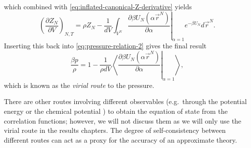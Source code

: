 which combined with \eqref{eq:inflated-canonical-Z-derivative} yields
\begin{equation*}
  \left( \frac{\partial Z_N}{\partial V} \right)_{N,T}
  =
  \rho Z_N
  -
  \frac{1}{d V}
  \int_{V^N}
  \left. \frac{\partial \beta U_N(\alpha \vec{r}^N)}{\partial \alpha} \right|_{\alpha = 1}
  e^{-\beta U_N}
  d\vec{r}^N.
\end{equation*}
Inserting this back into \eqref{eq:pressure-relation-2} gives the final result
\begin{equation}\label{eq:virial-route-pressure}
  \frac{\beta p}{\rho}
  =
  1
  -
  \frac{1}{\rho d V}
  \left\langle
  \left.
  \frac{\partial \beta U_N(\alpha \vec{r}^N)}{\partial \alpha}
  \right|_{\alpha = 1}
  \right\rangle,
\end{equation}
which is known as the \emph{virial route}%
to the pressure.

There are other routes involving different observables (e.g.\ through the potential energy or the chemical potential \cite{Santos2016}) to obtain the equation of state from the correlation functions; however, we will not discuss them as we will only use the virial route in the results chapters.
The degree of self-consistency between different routes can act as a proxy for the accuracy of an approximate theory.

\vspace{0.5em}

